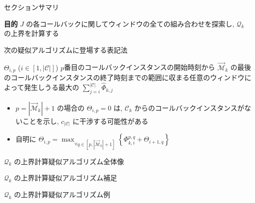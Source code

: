 \begin{frame}{セクションサマリ}
    \begin{itembox}[l]{\textbf{目的}}
        $J$ の各コールバックに関してウィンドウの全ての組み合わせを探索し, $\mathcal{Q}_{k}$ の上界を計算する
    \end{itembox}
\end{frame}

\begin{frame}{次の疑似アルゴリズムに登場する表記法}
    \begin{block}{$\Theta_{i, p}$ ($i \in[1,|\mathcal{C}|]$)}
        $ p $番目のコールバックインスタンスの開始時刻から $\overrightarrow{\mathcal{M}}_{k}$ の最後のコールバックインスタンスの終了時刻までの範囲に収まる任意のウィンドウによって発生しうる最大の $\sum_{j=i}^{|\mathcal{C}|} \hat{\Phi}_{k, j}$
    \end{block}
    \begin{itemize}
        \item $p=\left|\overrightarrow{\mathcal{M}}_{k}\right|+1$ の場合の $\Theta_{i, p}=0$ は, $\mathcal{C}_{k}$ からのコールバックインスタンスがないことを示し, $c_{|\mathcal{C}|}$ に干渉する可能性がある
        \item 自明に $\Theta_{i, p}=\max _{\forall q \in\left[p,\left|\overrightarrow{\mathcal{M}}_{k}\right|+1\right]}\left\{\Phi_{k, i}^{p, q}+\Theta_{i+1, q}\right\}$
    \end{itemize}
\end{frame}

\begin{frame}{$\mathcal{Q}_k$ の上界計算疑似アルゴリズム全体像}
\end{frame}

\begin{frame}{$\mathcal{Q}_k$ の上界計算疑似アルゴリズム補足}
\end{frame}

\begin{frame}{$\mathcal{Q}_k$ の上界計算疑似アルゴリズム例}
\end{frame}

